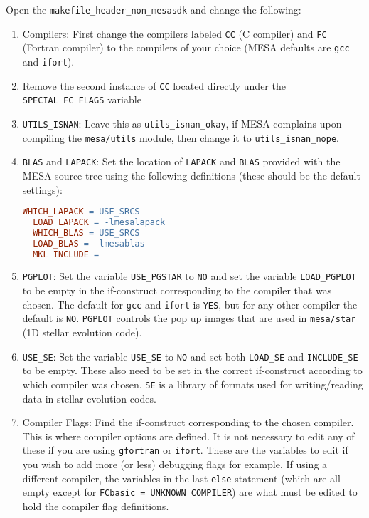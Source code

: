 Open the {\tt makefile\_header\_non\_mesasdk} and change the following:
\begin{enumerate}
\item Compilers: First change the compilers labeled {\tt CC} (C compiler) 
and {\tt FC} (Fortran compiler) to the compilers of your choice ({\sf MESA} 
defaults are {\tt gcc} and {\tt ifort}).

\item Remove the second instance of {\tt CC} located directly under the 
{\tt SPECIAL\_FC\_FLAGS} variable

\item {\tt UTILS\_ISNAN}: Leave this as {\tt utils\_isnan\_okay}, if {\sf MESA} 
complains upon compiling the {\tt mesa/utils} module, then change it to 
{\tt utils\_isnan\_nope}.

\item {\tt BLAS} and {\tt LAPACK}: Set the location of {\tt LAPACK} and 
{\tt BLAS} provided with the {\sf MESA} source tree using the following 
definitions (these should be the default settings):
\begin{lstlisting}[language=make,mathescape=false,upquote=true]
  WHICH_LAPACK = USE_SRCS
  LOAD_LAPACK = -lmesalapack
  WHICH_BLAS = USE_SRCS
  LOAD_BLAS = -lmesablas
  MKL_INCLUDE =
\end{lstlisting}

\item {\tt PGPLOT}: Set the variable {\tt USE\_PGSTAR} to {\tt NO} and set 
the variable {\tt LOAD\_PGPLOT} to be empty in the if-construct corresponding 
to the compiler that was chosen. The default for {\tt gcc} and {\tt ifort} is 
{\tt YES}, but for any other compiler the default is {\tt NO}. {\tt PGPLOT} 
controls the pop up images that are used in {\tt mesa/star} (1D stellar 
evolution code). 

\item {\tt USE\_SE}: Set the variable {\tt USE\_SE} to {\tt NO} and set both 
{\tt LOAD\_SE} and {\tt INCLUDE\_SE} to be empty. These also need to be set 
in the correct if-construct according to which compiler was chosen. 
{\tt SE} is a library of 
formats used for writing/reading data in stellar evolution codes.

\item Compiler Flags: Find the if-construct corresponding to the chosen 
compiler. This is where compiler options are defined. It is not necessary to 
edit any of these if you are using {\tt gfortran} or {\tt ifort}. These are 
the variables to edit if you wish to add more (or less) debugging flags 
for example. If using a different compiler, the variables in the last 
{\tt else} statement (which are all empty except for 
{\tt FCbasic = UNKNOWN COMPILER}) are what must be edited to hold the compiler 
flag definitions. 


\end{enumerate}
